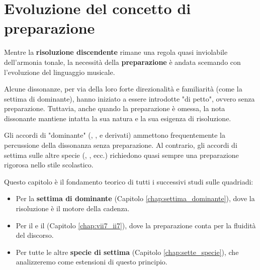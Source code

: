 \section{Evoluzione del concetto di preparazione}
\label{sec:evoluzione_preparazione}

Mentre la \textbf{risoluzione discendente} rimane una regola quasi inviolabile dell'armonia tonale, la necessità della \textbf{preparazione} è andata scemando con l'evoluzione del linguaggio musicale.

Alcune dissonanze, per via della loro forte direzionalità e familiarità (come la settima di dominante), hanno iniziato a essere introdotte "di petto", ovvero senza preparazione. Tuttavia, anche quando la preparazione è omessa, la nota dissonante mantiene intatta la sua natura e la sua esigenza di risoluzione.

\begin{regola}
        \label{reg:dissonanze_non_preparate}
        Gli accordi di "dominante" (, , e derivati) ammettono frequentemente la percussione della dissonanza senza preparazione. Al contrario, gli accordi di settima sulle altre specie (, , ecc.) richiedono quasi sempre una preparazione rigorosa nello stile scolastico.
\end{regola}

Questo capitolo è il fondamento teorico di tutti i successivi studi sulle quadriadi:
\begin{itemize}
        \item Per la \textbf{settima di dominante} (Capitolo \ref{chap:settima_dominante}), dove la risoluzione è il motore della cadenza.
        \item Per il \textbf{} e il \textbf{} (Capitolo \ref{chap:vii7_ii7}), dove la preparazione conta per la fluidità del discorso.
        \item Per tutte le altre \textbf{specie di settima} (Capitolo \ref{chap:sette_specie}), che analizzeremo come estensioni di questo principio.
\end{itemize}
